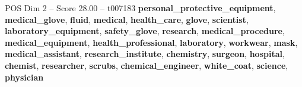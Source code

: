 \begin{textsample}{POS Dim 2 – Score 28.00 – t007183}  \label{ex:f2_pos_033}
\textbf{personal\_protective\_equipment}, \textbf{medical\_glove}, \textbf{fluid}, \textbf{medical}, \textbf{health\_care}, \textbf{glove}, \textbf{scientist}, \textbf{laboratory\_equipment}, \textbf{safety\_glove}, \textbf{research}, \textbf{medical\_procedure}, \textbf{medical\_equipment}, \textbf{health\_professional}, \textbf{laboratory}, \textbf{workwear}, \textbf{mask}, \textbf{medical\_assistant}, \textbf{research\_institute}, \textbf{chemistry}, \textbf{surgeon}, \textbf{hospital}, \textbf{chemist}, \textbf{researcher}, \textbf{scrubs}, \textbf{chemical\_engineer}, \textbf{white\_coat}, \textbf{science}, \textbf{physician}

\end{textsample}
